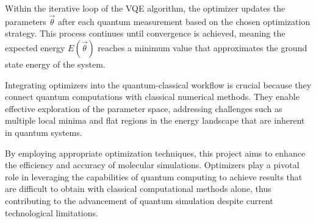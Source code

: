 Within the iterative loop of the VQE algorithm, the optimizer updates the parameters \(\vec{\theta}\) after each quantum measurement based on the chosen optimization strategy. This process continues until convergence is achieved, meaning the expected energy \(E(\vec{\theta})\) reaches a minimum value that approximates the ground state energy of the system.

Integrating optimizers into the quantum-classical workflow is crucial because they connect quantum computations with classical numerical methods. They enable effective exploration of the parameter space, addressing challenges such as multiple local minima and flat regions in the energy landscape that are inherent in quantum systems.

By employing appropriate optimization techniques, this project aims to enhance the efficiency and accuracy of molecular simulations. Optimizers play a pivotal role in leveraging the capabilities of quantum computing to achieve results that are difficult to obtain with classical computational methods alone, thus contributing to the advancement of quantum simulation despite current technological limitations.